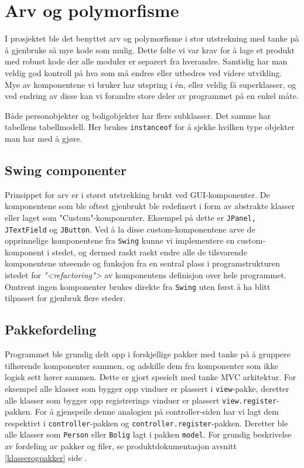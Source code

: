 \section{Arv og polymorfisme}
I prosjektet ble det benyttet arv og polymorfisme i stor utstrekning med tanke på å gjenbruke så mye kode som mulig. Dette følte vi var krav for å lage et produkt med robust kode der alle moduler er separert fra hverandre. Samtidig har man veldig god kontroll på hva som må endres eller utbedres ved videre utvikling. Mye av komponentene vi bruker har utspring i én, eller veldig få superklasser, og ved endring av disse kan vi forandre store deler av programmet på en enkel måte.

Både personobjekter og boligobjekter har flere subklasser. Det samme har tabellens tabellmodell. Her brukes \texttt{instanceof} for å sjekke hvilken type objekter man har med å gjøre.

\subsection{Swing componenter}
Prinsippet for arv er i størst utstrekking brukt ved GUI-komponenter. De komponentene som ble oftest gjenbrukt ble redefinert i form av abstrakte klasser eller laget som "Custom"-komponenter. Eksempel på dette er \texttt{JPanel, JTextField} og \texttt{JButton}. Ved å la disse custom-komponentene arve de opprinnelige komponentene fra \texttt{Swing} kunne vi implementere en custom-komponent i stedet, og dermed raskt raskt endre alle de tilsvarende komponentene utseende og funksjon fra en sentral plass i programstrukturen istedet for \textit{"<refactoring">} av komponentens definisjon over hele programmet.\\  
Omtrent ingen komponenter brukes direkte fra \texttt{Swing} uten først å ha blitt tilpasset for gjenbruk flere steder.

\subsection{Pakkefordeling}
Programmet ble grundig delt opp i forskjellige pakker med tanke på å gruppere tilhørende komponenter sammen, og adskille dem fra komponenter som ikke logisk sett hører sammen. Dette er gjort spesielt med tanke MVC arkitektur. For eksempel alle klasser som bygger opp vinduer er plassert i \texttt{view}-pakke, deretter alle klasser som bygger opp registrerings vinduer er plassert \texttt{view.register}-pakken. For å gjenspeile denne analogien på controller-siden har vi lagt dem respektivt i \texttt{controller}-pakken og \texttt{controller.register}-pakken. Deretter ble alle klasser som \texttt{Person} eller \texttt{Bolig} lagt i pakken \texttt{model}. For grundig beskrivelse av fordeling av pakker og filer, se produktdokumentasjon avsnitt \ref{klasserogpakker} side \pageref{sec:klasserogpakker}.

